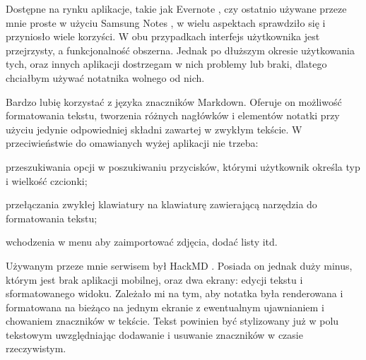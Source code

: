 \documentclass[shortabstract]{iithesis}
\begin{document}
Dostępne na rynku aplikacje, takie jak Evernote \cite{evernote}, czy ostatnio używane przeze mnie proste w użyciu Samsung Notes \cite{samsungNotes}, w wielu aspektach sprawdziło się i przyniosło wiele korzyści. W obu przypadkach interfejs użytkownika jest przejrzysty, a funkcjonalność obszerna. Jednak po dłuższym okresie użytkowania tych, oraz innych aplikacji dostrzegam w nich problemy lub braki, dlatego chciałbym używać notatnika wolnego od nich.

Bardzo lubię korzystać z języka znaczników Markdown. Oferuje on możliwość formatowania tekstu, tworzenia różnych nagłówków i elementów notatki przy użyciu jedynie odpowiedniej składni zawartej w zwykłym tekście. W przeciwieństwie do omawianych wyżej aplikacji nie trzeba:
\begin{compactitem}
    \item przeszukiwania opcji w poszukiwaniu przycisków, którymi użytkownik określa typ i wielkość czcionki;
    \item przełączania zwykłej klawiatury na klawiaturę zawierającą narzędzia do formatowania tekstu;
    \item wchodzenia w menu aby zaimportować zdjęcia, dodać listy itd.
\end{compactitem} 
Używanym przeze mnie serwisem był HackMD \cite{hackmd}. Posiada on jednak duży minus, którym jest brak aplikacji mobilnej, oraz dwa ekrany: edycji tekstu i sformatowanego widoku. Zależało mi na tym, aby notatka była renderowana i formatowana na bieżąco na jednym ekranie z ewentualnym ujawnianiem i chowaniem znaczników w tekście. Tekst powinien być stylizowany już w polu tekstowym uwzględniając dodawanie i usuwanie znaczników w czasie rzeczywistym.
\end{document}
